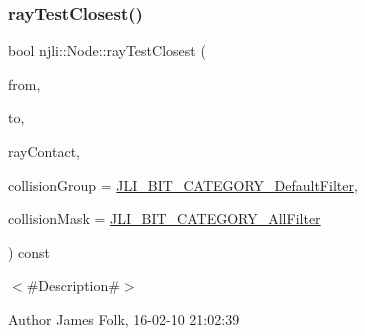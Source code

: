 \begin{DoxyCodeInclude}
\end{DoxyCodeInclude}
\mbox{\label{classnjli_1_1_node_a1665e8075c188baf897682470cd84103}} 
\subsubsection{\texorpdfstring{ray\+Test\+Closest()}{rayTestClosest()}\hspace{0.1cm}{\footnotesize\ttfamily [1/2]}}
{\footnotesize\ttfamily bool njli\+::\+Node\+::ray\+Test\+Closest (\begin{DoxyParamCaption}\item[{const bt\+Vector3 \&}]{from,  }\item[{const bt\+Vector3 \&}]{to,  }\item[{\mbox{\hyperlink{classnjli_1_1_physics_ray_contact}{Physics\+Ray\+Contact}} \&}]{ray\+Contact,  }\item[{\mbox{\hyperlink{namespacenjli_af7b302a2b48bb644f85c88080925c974}{njli\+Bit\+Categories}}}]{collision\+Group = {\ttfamily \mbox{\hyperlink{namespacenjli_af7b302a2b48bb644f85c88080925c974a53b33337014e199f56e752574f36981e}{J\+L\+I\+\_\+\+B\+I\+T\+\_\+\+C\+A\+T\+E\+G\+O\+R\+Y\+\_\+\+Default\+Filter}}},  }\item[{\mbox{\hyperlink{namespacenjli_af7b302a2b48bb644f85c88080925c974}{njli\+Bit\+Categories}}}]{collision\+Mask = {\ttfamily \mbox{\hyperlink{namespacenjli_af7b302a2b48bb644f85c88080925c974a0fba80cad161dda96de5cbda9091cdce}{J\+L\+I\+\_\+\+B\+I\+T\+\_\+\+C\+A\+T\+E\+G\+O\+R\+Y\+\_\+\+All\+Filter}}} }\end{DoxyParamCaption}) const}



$<$\#\+Description\#$>$ 

\begin{DoxyAuthor}{Author}
James Folk, 16-\/02-\/10 21\+:02\+:39
\end{DoxyAuthor}

